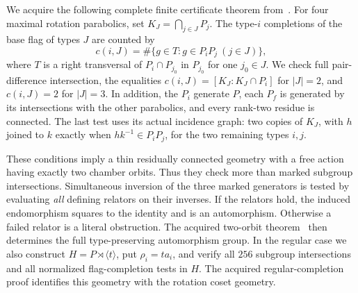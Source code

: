 \documentclass[11pt,a4paper]{article}
\newcommand{\gen}[1]{\langle #1\rangle}\newcommand{\Aut}{\operatorname{Aut}}
\begin{document}
We acquire the following complete finite certificate theorem from~\cite{finite}.
For four maximal rotation parabolics, set $K_J=\bigcap_{j\in J}P_j$.
The type-$i$ completions of the base flag of types $J$ are counted by
\[
 c(i,J)=\#\{g\in T:g\in P_iP_j\ (j\in J)\},
\]
where $T$ is a right transversal of $P_i\cap P_{j_0}$ in $P_{j_0}$ for
one $j_0\in J$. We check full pair-difference intersection, the equalities
$c(i,J)=[K_J:K_J\cap P_i]$ for $|J|=2$, and $c(i,J)=2$ for $|J|=3$.
In addition, the $P_i$ generate $P$, each $P_f$ is generated by its
intersections with the other parabolics, and every rank-two residue is
connected. The last test uses its actual incidence graph: two copies of
$K_J$, with $h$ joined to $k$ exactly when $hk^{-1}\in P_iP_j$, for the
two remaining types $i,j$.

These conditions imply a thin residually connected geometry with a free
action having exactly two chamber orbits. Thus they check more than
marked subgroup intersections. Simultaneous inversion of the three
marked generators is tested by evaluating \emph{all} defining relators
on their inverses. If the relators hold, the induced endomorphism squares
to the identity and is an automorphism. Otherwise a failed relator is a
literal obstruction. The acquired two-orbit theorem~\cite{chambers}
then determines the full type-preserving automorphism group. In the
regular case we also construct $H=P\rtimes\gen t$, put
$\rho_i=t a_i$, and verify all $256$ subgroup intersections and all
normalized flag-completion tests in $H$. The acquired regular-completion
proof identifies this geometry with the rotation coset geometry.
\end{document}
